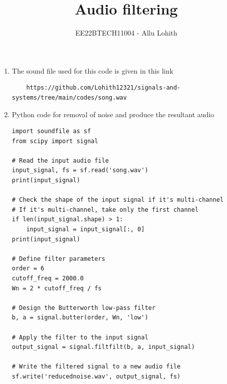 \documentclass[journal,12pt,twocolumn]{IEEEtran}
\theoremstyle{remark}
\begin{document}

\vspace{3cm}

\title{Audio filtering}
\author{EE22BTECH11004 - Allu Lohith}

\maketitle
\newpage
\bigskip
\begin{enumerate}[label=\thesection.\arabic*
,ref=\thesection.\theenumi]
\section{Digital Filter}
\label{input_sound}
\item The sound file used for this code is given in this link\label{prob:audio_filter_problem}
\begin{lstlisting}
    https://github.com/Lohith12321/signals-and-systems/tree/main/codes/song.wav
\end{lstlisting}
\item Python code for removal of noise and produce the resultant audio
\begin{lstlisting}
import soundfile as sf
from scipy import signal

# Read the input audio file
input_signal, fs = sf.read('song.wav')
print(input_signal)

# Check the shape of the input signal if it's multi-channel
# If it's multi-channel, take only the first channel
if len(input_signal.shape) > 1:
    input_signal = input_signal[:, 0]
print(input_signal)

# Define filter parameters
order = 6
cutoff_freq = 2000.0
Wn = 2 * cutoff_freq / fs

# Design the Butterworth low-pass filter
b, a = signal.butter(order, Wn, 'low')

# Apply the filter to the input signal
output_signal = signal.filtfilt(b, a, input_signal)

# Write the filtered signal to a new audio file
sf.write('reducednoise.wav', output_signal, fs)
\end{lstlisting}
    


\end{enumerate}
\end{document}
